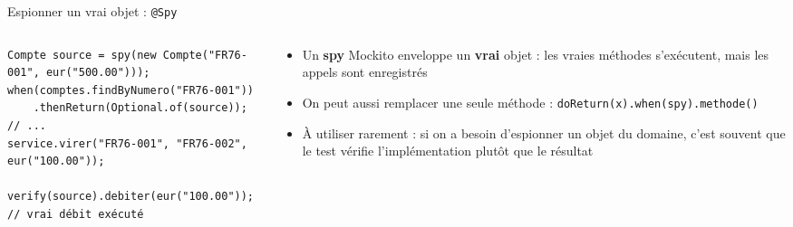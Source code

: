 \documentclass[aspectratio=169,10pt]{beamer}
\begin{document}
\begin{frame}[fragile]{Espionner un vrai objet : \texttt{@Spy}}
  \begin{columns}[T]
    \begin{column}{0.55\textwidth}
\begin{lstlisting}[basicstyle=\lstcode\scriptsize]
Compte source = spy(new Compte("FR76-001", eur("500.00")));
when(comptes.findByNumero("FR76-001"))
    .thenReturn(Optional.of(source));
// ...
service.virer("FR76-001", "FR76-002", eur("100.00"));

verify(source).debiter(eur("100.00"));   // vrai débit exécuté
\end{lstlisting}
    \end{column}
    \begin{column}{0.42\textwidth}
      \begin{itemize}
        \item Un \textbf{spy} Mockito enveloppe un \textbf{vrai} objet : les vraies méthodes s'exécutent, mais les appels sont enregistrés
        \item On peut aussi remplacer une seule méthode : \texttt{doReturn(x).when(spy).methode()}
        \item \alert{À utiliser rarement} : si on a besoin d'espionner un objet du domaine, c'est souvent que le test vérifie l'implémentation plutôt que le résultat
      \end{itemize}
    \end{column}
  \end{columns}
\end{frame}

\end{document}
